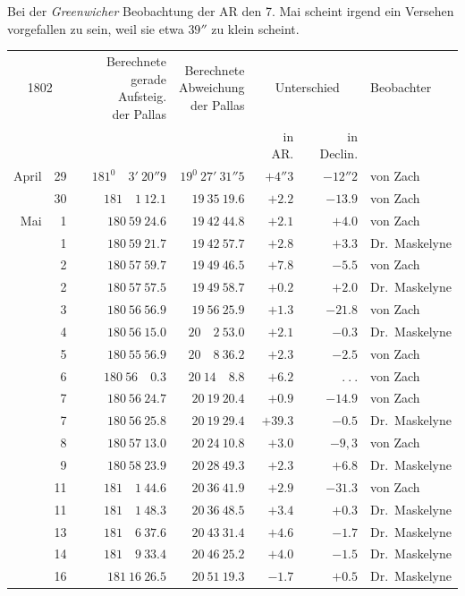 \expandafter\def\csname HistoricalNoteText20\endcsname{Bei der \textit{Greenwicher} Beobachtung der AR den 7. Mai scheint irgend ein Versehen vorgefallen zu sein, weil sie etwa $39''$ zu klein scheint.}
%
\begin{center}
{\small\setlength{\tabcolsep}{4pt}
\begin{tabular}{r r|r|r|r|r|l}
\multicolumn{2}{c|}{1802}&\shortstack{Berechnete\\gerade Aufsteig.\\der Pallas}&\shortstack{Berechnete\\Abweichung\\der Pallas}&\multicolumn{2}{c|}{Unterschied}&Beobachter\\
\multicolumn{2}{c|}{}&&&in AR.&in Declin.&\\\hline
April&29&$181^0\quad3'\ 20''9$&$19^0\ 27'\ 31''5$&$+4''3$&$-12''2$&von Zach\\
&30&$181\quad1\ 12.1$&$19\ 35\ 19.6$&$+2.2$&$-13.9$&von Zach\\
Mai&1&$180\ 59\ 24.6$&$19\ 42\ 44.8$&$+2.1$&$+4.0$&von Zach\\
&1&$180\ 59\ 21.7$&$19\ 42\ 57.7$&$+2.8$&$+3.3$&Dr.\ Maskelyne\\
&2&$180\ 57\ 59.7$&$19\ 49\ 46.5$&$+7.8$&$-5.5$&von Zach\\
&2&$180\ 57\ 57.5$&$19\ 49\ 58.7$&$+0.2$&$+2.0$&Dr.\ Maskelyne\\
&3&$180\ 56\ 56.9$&$19\ 56\ 25.9$&$+1.3$&$-21.8$&von Zach\\
&4&$180\ 56\ 15.0$&$20\quad2\ 53.0$&$+2.1$&$-0.3$&Dr.\ Maskelyne\\
&5&$180\ 55\ 56.9$&$20\quad8\ 36.2$&$+2.3$&$-2.5$&von Zach\\
&6&$180\ 56\quad0.3$&$20\ 14\quad8.8$&$+6.2$&$\ .\ .\ .$&von Zach\\
&7&$180\ 56\ 24.7$&$20\ 19\ 20.4$&$+0.9$&$-14.9$&von Zach\\
&7&$180\ 56\ 25.8$&$20\ 19\ 29.4$&$+39.3$&$-0.5$&Dr.\ Maskelyne\\
&8&$180\ 57\ 13.0$&$20\ 24\ 10.8$&$+3.0$&$-9{,}3$&von Zach\\
&9&$180\ 58\ 23.9$&$20\ 28\ 49.3$&$+2.3$&$+6.8$&Dr.\ Maskelyne\\
&11&$181\quad1\ 44.6$&$20\ 36\ 41.9$&$+2.9$&$-31.3$&von Zach\\
&11&$181\quad1\ 48.3$&$20\ 36\ 48.5$&$+3.4$&$+0.3$&Dr.\ Maskelyne\\
&13&$181\quad6\ 37.6$&$20\ 43\ 31.4$&$+4.6$&$-1.7$&Dr.\ Maskelyne\\
&14&$181\quad9\ 33.4$&$20\ 46\ 25.2$&$+4.0$&$-1.5$&Dr.\ Maskelyne\\
&16&$181\ 16\ 26.5$&$20\ 51\ 19.3$&$-1.7$&$+0.5$&Dr.\ Maskelyne
\end{tabular}}
\end{center}

